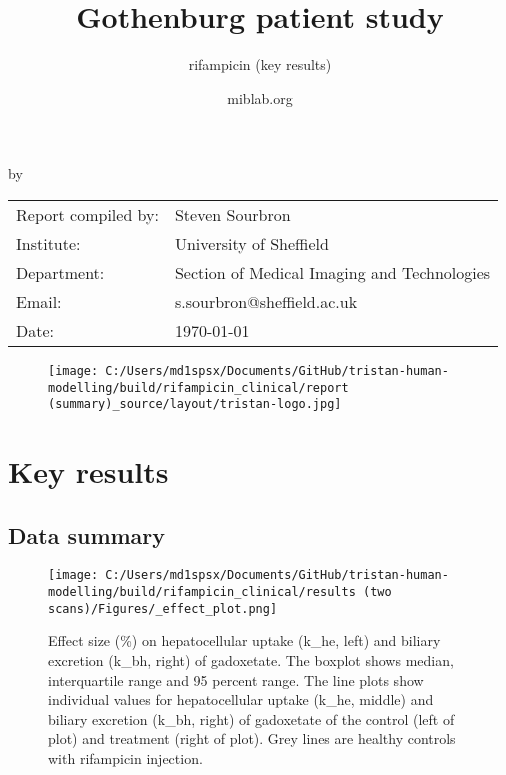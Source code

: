 \documentclass{epflreport}%
\begin{document}
%
\normalsize%
\frontmatter%
\title{Gothenburg patient study}%
\subtitle{rifampicin (key results)}%
\author{miblab.org}%
\subject{D2.13 {-} Internal report}%
%
%
%
\makecover%
\begin{titlepage}%
\begin{center}%
\makeatletter%
\largetitlestyle\fontsize{45}{45}\selectfont\@title%
\makeatother%
\linebreak%
\makeatletter%
\ifdefvoid{\@subtitle}{}{\bigskip\titlestyle\fontsize{20}{20}\selectfont\@subtitle}%
\makeatother%
\linebreak%
\bigskip%
\bigskip%
by%
\linebreak%
\bigskip%
\bigskip%
\makeatletter%
\largetitlestyle\fontsize{25}{25}\selectfont\@author%
\makeatother%
\vfill%
\large%
\begin{tabular}{ll}%
\hline%
Report compiled by: &Steven Sourbron\\%
Institute: &University of Sheffield\\%
Department: &Section of Medical Imaging and Technologies\\%
Email: &s.sourbron@sheffield.ac.uk\\%
Date: &\today\\%
\hline%
\end{tabular}%


\begin{figure}[b!]%
\centering%
\centering%
\texttt{[image: C:/Users/md1spsx/Documents/GitHub/tristan-human-modelling/build/rifampicin\_clinical/report (summary)\_source/layout/tristan-logo.jpg]}%
\end{figure}

%
\end{center}%
\end{titlepage}%
\newpage%
\tableofcontents%
\mainmatter%
\clearpage%
\chapter{Key results}%
\section{Data summary}%
\label{sec:Datasummary}%

%


\begin{figure}[h!]%
\centering%
\texttt{[image: C:/Users/md1spsx/Documents/GitHub/tristan-human-modelling/build/rifampicin\_clinical/results (two scans)/Figures/\_effect\_plot.png]}%
\caption{Effect size (\%) on hepatocellular uptake (k\_he, left) and biliary excretion (k\_bh, right) of gadoxetate. The boxplot shows median, interquartile range and 95 percent range. The line plots show individual values for hepatocellular uptake (k\_he, middle) and biliary excretion (k\_bh, right) of gadoxetate of the control (left of plot) and treatment (right of plot). Grey lines are healthy controls with rifampicin injection.}%
\end{figure}
\end{document}
